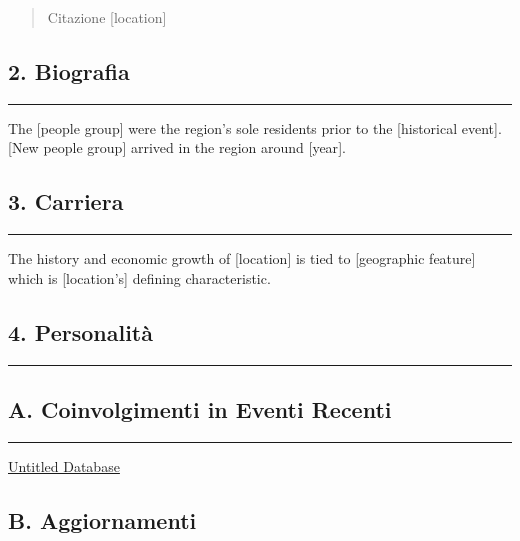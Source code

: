 \begin{quote}
Citazione {[}location{]}
\end{quote}

\subsection{2. Biografia}\label{biografia}

\begin{center}\rule{0.5\linewidth}{0.5pt}\end{center}

The {[}people group{]} were the region's sole residents prior to the
{[}historical event{]}. {[}New people group{]} arrived in the region
around {[}year{]}.

\subsection{3. Carriera}\label{carriera}

\begin{center}\rule{0.5\linewidth}{0.5pt}\end{center}

The history and economic growth of {[}location{]} is tied to
{[}geographic feature{]} which is {[}location's{]} defining
characteristic.

\subsection{4. Personalità}\label{personalituxe0}

\begin{center}\rule{0.5\linewidth}{0.5pt}\end{center}

\subsection{A. Coinvolgimenti in Eventi
Recenti}\label{a.-coinvolgimenti-in-eventi-recenti}

\begin{center}\rule{0.5\linewidth}{0.5pt}\end{center}

\href{Untitled\%20Database\%20e1421d212e594cafaff9fd94db43468b.csv}{Untitled
Database}

\subsection{B. Aggiornamenti}\label{b.-aggiornamenti}

